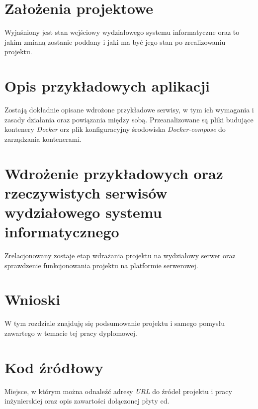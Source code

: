 \documentclass[polish, a4paper, 12pt, oneside]{book}
\begin{document}
	\chapter{Założenia projektowe}
	Wyjaśniony jest stan wejściowy wydziałowego systemu informatyczne oraz to jakim zmianą zostanie poddany i jaki ma być jego stan po zrealizowaniu projektu.
	
	\chapter{Opis przykładowych aplikacji}
Zostają dokładnie opisane wdrożone przykładowe serwisy, w tym ich wymagania i zasady działania oraz powiązania między sobą. Przeanalizowane są pliki budujące kontenery \textit{Docker} orz plik konfiguracyjny środowiska \textit{Docker-compose} do zarządzania kontenerami.
	 
	\chapter{Wdrożenie przykładowych oraz rzeczywistych serwisów wydziałowego systemu informatycznego}
	Zrelacjonowany zostaje etap wdrażania projektu na wydziałowy serwer oraz sprawdzenie funkcjonowania projektu na platformie serwerowej.
	 
	\chapter{Wnioski}
	W tym rozdziale znajduję się podsumowanie projektu i samego pomysłu zawartego w temacie tej pracy dyplomowej.
	\newpage
	\chapter{Kod źródłowy}
	Miejsce, w którym można odnaleźć adresy \textit{URL} do źródeł projektu i pracy inżynierskiej oraz opis zawartości dołączonej płyty cd.
	
	
\end{document}
